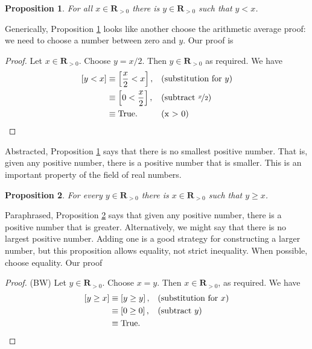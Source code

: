 \documentclass[12pt,fleqn,answers]{article}
\newcommand{\reals}{\mathbf{R}}
\newcommand{\true}{\mathrm{True}}
\newenvironment{myproof}
  {\begin{shaded}\begin{proof}}
  {\end{proof}\end{shaded}}
\newtheorem{prop}{Proposition}
\begin{document}
    \begin{prop}   For all $x \in \reals_{>0}$ there is 
      $y \in \reals_{> 0}$ such that $y < x$.  \label{p3}
    \end{prop}
     
    \noindent Generically, Proposition \ref{p3} looks like another choose the arithmetic average proof: we need to choose a number between zero and $y$. Our proof is
      
      \begin{myproof}  Let $x \in \reals_{>0}$. Choose $y = x/2$. Then $y \in \reals_{>0}$ as required. We have
         \begin{align*}
         \left[y < x \right] &\equiv \left[\frac{x}{2} < x \right], &&\text{(substitution for $y$)} \\
                                   &\equiv \left[0 < \frac{x}{2}  \right], &&\text{(subtract $\nicefrac{x}{2}$)} \\
                                   &\equiv \true.  &&\text{(x > 0)} \qedhere
      \end{align*}
      \end{myproof}
\noindent Abstracted, Proposition \ref{p3} says that there is no smallest positive number. That is, given any positive number, there is a 
positive number that is smaller.  This is an important property of the field of real numbers.
       

       \begin{prop} For every $y \in \reals_{> 0}$ there is  
        $x \in \reals_{>0}$ such that $y \geq  x$. \label{p4}
      \end{prop}
      \noindent Paraphrased, Proposition \ref{p4} says that given any positive number, there is a positive number that is greater. Alternatively, we
      might say that there is no largest positive number. Adding one is a good strategy for constructing a larger number, but this proposition
      allows equality, not strict inequality.  When possible, choose equality. Our proof
      
       \begin{myproof} (BW) Let $y \in \reals_{>0}$. Choose $x = y$. Then $x \in \reals_{>0}$, as 
        required. We have
       \begin{align*}
         \left[y \geq x  \right] &\equiv \left[y \geq  y \right], && \text{(substitution for $x$)} \\
                                      &\equiv \left[0 \geq 0 \right], &&\text{(subtract $y$)} \\
                                      &\equiv \true. && \qedhere
       \end{align*}
       
       \end{myproof}
\end{document}
